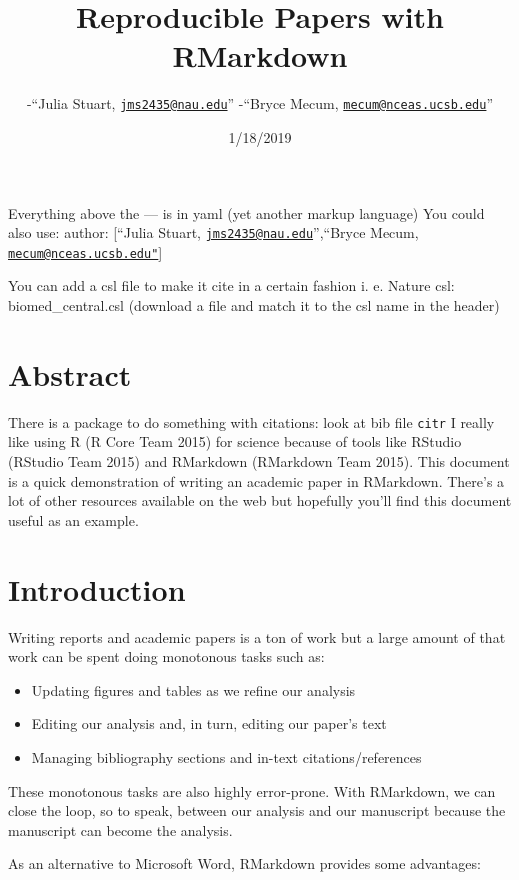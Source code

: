 \documentclass[]{article}
\title{Reproducible Papers with RMarkdown}
\author{-``Julia Stuart,
\href{mailto:jms2435@nau.edu}{\nolinkurl{jms2435@nau.edu}}'' -``Bryce
Mecum,
\href{mailto:mecum@nceas.ucsb.edu}{\nolinkurl{mecum@nceas.ucsb.edu}}''}
\date{1/18/2019}
\providecommand{\tightlist}{%
  \setlength{\itemsep}{0pt}\setlength{\parskip}{0pt}}
\begin{document}
\maketitle

Everything above the --- is in yaml (yet another markup language) You
could also use: author: {[}``Julia Stuart,
\href{mailto:jms2435@nau.edu}{\nolinkurl{jms2435@nau.edu}}'',``Bryce
Mecum,
\href{mailto:mecum@nceas.ucsb.edu\%22}{\nolinkurl{mecum@nceas.ucsb.edu"}}{]}

You can add a csl file to make it cite in a certain fashion i. e. Nature
csl: biomed\_central.csl (download a file and match it to the csl name
in the header)

\section{Abstract}\label{abstract}

There is a package to do something with citations: look at bib file
\texttt{citr} I really like using R (R Core Team 2015) for science
because of tools like RStudio (RStudio Team 2015) and RMarkdown
(RMarkdown Team 2015). This document is a quick demonstration of writing
an academic paper in RMarkdown. There's a lot of other resources
available on the web but hopefully you'll find this document useful as
an example.

\section{Introduction}\label{introduction}

Writing reports and academic papers is a ton of work but a large amount
of that work can be spent doing monotonous tasks such as:

\begin{itemize}
\tightlist
\item
  Updating figures and tables as we refine our analysis
\item
  Editing our analysis and, in turn, editing our paper's text
\item
  Managing bibliography sections and in-text citations/references
\end{itemize}

These monotonous tasks are also highly error-prone. With RMarkdown, we
can close the loop, so to speak, between our analysis and our manuscript
because the manuscript can become the analysis.

As an alternative to Microsoft Word, RMarkdown provides some advantages:
\end{document}
